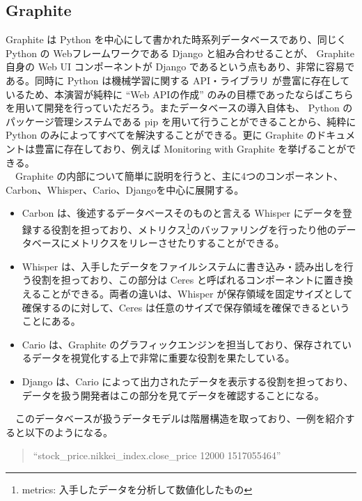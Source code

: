 \documentclass{scrartcl}
\begin{document}
\subsection{Graphite}
\label{sec:org0e1f355}
Graphite は Python を中心にして書かれた時系列データベースであり、同じく Python の Webフレームワークである Django と組み合わせることが、 Graphite 自身の Web UI コンポーネントが Django であるという点もあり、非常に容易である。同時に Python は機械学習に関する API・ライブラリ が豊富に存在しているため、本演習が純粋に ``Web APIの作成'' のみの目標であったならばこちらを用いて開発を行っていただろう。またデータベースの導入自体も、 Python のパッケージ管理システムである pip を用いて行うことができることから、純粋に Python のみによってすべてを解決することができる。更に Graphite のドキュメントは豊富に存在しており、例えば Monitoring with Graphite \cite{graphite-oreilly} を挙げることができる。\\
　Graphite の内部について簡単に説明を行うと、主に4つのコンポーネント、Carbon、Whisper、Cario、Djangoを中心に展開する。\\
\begin{itemize}
\item Carbon は、後述するデータベースそのものと言える Whisper にデータを登録する役割を担っており、メトリクス\footnote[1]{metrics: 入手したデータを分析して数値化したもの}のバッファリングを行ったり他のデータベースにメトリクスをリレーさせたりすることができる。\\
\item Whisper は、入手したデータをファイルシステムに書き込み・読み出しを行う役割を担っており、この部分は Ceres と呼ばれるコンポーネントに置き換えることができる。両者の違いは、Whisper が保存領域を固定サイズとして確保するのに対して、Ceres は任意のサイズで保存領域を確保できるということにある。\\
\item Cario は、Graphite のグラフィックエンジンを担当しており、保存されているデータを視覚化する上で非常に重要な役割を果たしている。\\
\item Django は、Cario によって出力されたデータを表示する役割を担っており、データを扱う開発者はこの部分を見てデータを確認することになる。\\
\end{itemize}

　このデータベースが扱うデータモデルは階層構造を取っており、一例を紹介すると以下のようになる。\\
\begin{verse}
``stock\_price.nikkei\_index.close\_price 12000 1517055464''\\
\end{verse}
\end{document}

